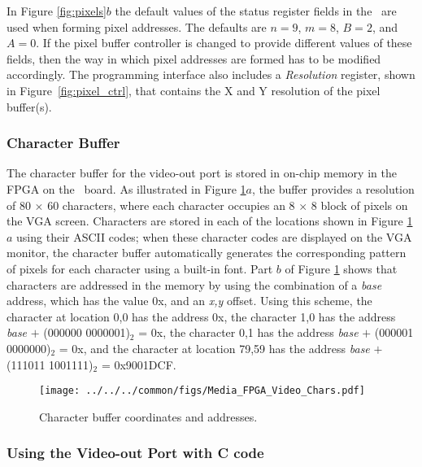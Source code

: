 In Figure \ref{fig:pixels}$b$ the default values of the status register fields in the \systemName~are used when forming pixel addresses. The defaults are $n=9$,  $m=8$, $B = 2$,
and $A = 0$. If the pixel buffer controller is changed to provide different values of
these fields, then the way in which pixel addresses are formed has to be modified accordingly. 
The programming interface also includes a {\it Resolution} register, shown 
in Figure~\ref{fig:pixel_ctrl}, that contains the X and Y resolution of the pixel buffer(s).  

\subsubsection{Character Buffer}

The character buffer for the video-out port is stored in on-chip memory in the FPGA
on the \DEBoard~board. As illustrated in Figure \ref{fig:chars}$a$, the buffer provides 
a resolution of 80 $\times$ 60 characters, where each character occupies an 8 $\times$ 8
block of pixels on the VGA screen. Characters are stored in each of the locations shown in
Figure \ref{fig:chars}$a$ using their ASCII codes; when these character codes are 
displayed on the VGA monitor, the character buffer automatically generates the
corresponding pattern of pixels for each character using a built-in font. 
Part $b$ of Figure \ref{fig:chars} shows that characters are addressed in the memory by 
using the combination of a {\it base} address, which has the value 
{\sf 0x}, and an {\it x,y}
offset. Using this scheme, the character at location 0,0 has the address
{\sf 0x}, 
the character 1,0 has the address {\it base} $+$ (000000 0000001)$_2$ = {\sf 0x}, 
the character 0,1 has the address {\it base} $+$ (000001 0000000)$_2$ = {\sf 0x}, and 
the character at location 79,59 has the address {\it base} $+$ (111011 1001111)$_2$ = 
{\sf 0x\baseAddressOffset 9001DCF}. 

\begin{figure}[h!]
   \begin{center}
       \texttt{[image: ../../../common/figs/Media\_FPGA\_Video\_Chars.pdf]}
   \end{center}
   \caption{Character buffer coordinates and addresses.}
	\label{fig:chars}
\end{figure}

\subsubsection{Using the Video-out Port with C code}


